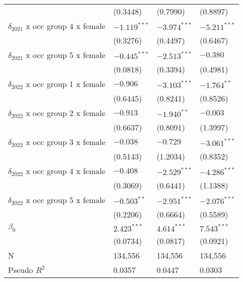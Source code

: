 \begin{tabular}{llll}
                                       &           (0.3448) &           (0.7990) &           (0.8897) \\
$\delta_{2021}$ x occ group 4 x female &     $-1.119^{***}$ &     $-3.974^{***}$ &     $-5.211^{***}$ \\
                                       &           (0.3276) &           (0.4497) &           (0.6467) \\
$\delta_{2021}$ x occ group 5 x female &     $-0.445^{***}$ &     $-2.513^{***}$ &           $-0.380$ \\
                                       &           (0.0818) &           (0.3394) &           (0.4981) \\
$\delta_{2022}$ x occ group 1 x female &           $-0.906$ &     $-3.103^{***}$ &      $-1.764^{**}$ \\
                                       &           (0.6445) &           (0.8241) &           (0.8526) \\
$\delta_{2022}$ x occ group 2 x female &           $-0.913$ &      $-1.940^{**}$ &           $-0.003$ \\
                                       &           (0.6637) &           (0.8091) &           (1.3997) \\
$\delta_{2022}$ x occ group 3 x female &           $-0.038$ &           $-0.729$ &     $-3.061^{***}$ \\
                                       &           (0.5143) &           (1.2034) &           (0.8352) \\
$\delta_{2022}$ x occ group 4 x female &           $-0.408$ &     $-2.529^{***}$ &     $-4.286^{***}$ \\
                                       &           (0.3069) &           (0.6441) &           (1.1388) \\
$\delta_{2022}$ x occ group 5 x female &      $-0.503^{**}$ &     $-2.951^{***}$ &     $-2.076^{***}$ \\
                                       &           (0.2206) &           (0.6664) &           (0.5589) \\
$\beta_0$                              &      $2.423^{***}$ &      $4.614^{***}$ &      $7.543^{***}$ \\
                                       &           (0.0734) &           (0.0817) &           (0.0921) \\
N                                      &            134,556 &            134,556 &            134,556 \\
Pseudo $R^2$                           &             0.0357 &             0.0447 &             0.0303 \\
\bottomrule
\end{tabular}
